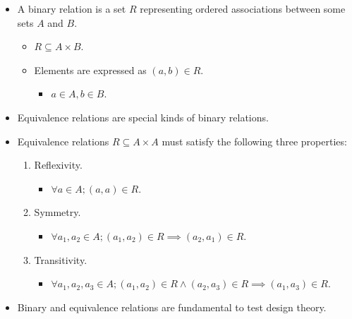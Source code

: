 \documentclass{article}
\begin{document}
\begin{itemize}
\begin{enumerate}
\begin{itemize}
			\item Introduces faults as the program is running.
			\item Typically automated.
			\item Typically performed by use of special software triggers.
		\end{itemize}
	\end{enumerate}
	\item A binary relation is a set $R$ representing ordered associations between some sets $A$ and $B$.
	\begin{itemize}
		\item $R \subseteq A \times B$.
		\item Elements are expressed as $(a, b) \in R$.
		\begin{itemize}
			\item $a \in A, b \in B$.
		\end{itemize}
	\end{itemize}
	\item Equivalence relations are special kinds of binary relations.
	\item Equivalence relations $R \subseteq A \times A$ must satisfy the following three properties:
	\begin{enumerate}
		\item Reflexivity.
		\begin{itemize}
			\item $\forall a \in A; (a, a) \in R$.
		\end{itemize}
		\item Symmetry.
		\begin{itemize}
			\item $\forall a_1, a_2 \in A; (a_1, a_2) \in R \implies (a_2, a_1) \in R$.
		\end{itemize}
		\item Transitivity.
		\begin{itemize}
			\item $\forall a_1, a_2, a_3 \in A; (a_1, a_2) \in R \wedge (a_2, a_3) \in R \implies (a_1, a_3) \in R$.
		\end{itemize}
	\end{enumerate}
	\item Binary and equivalence relations are fundamental to test design theory.
\end{itemize}

\ifdefined\iscombined
	\newpage
\else
	
\end{document}
